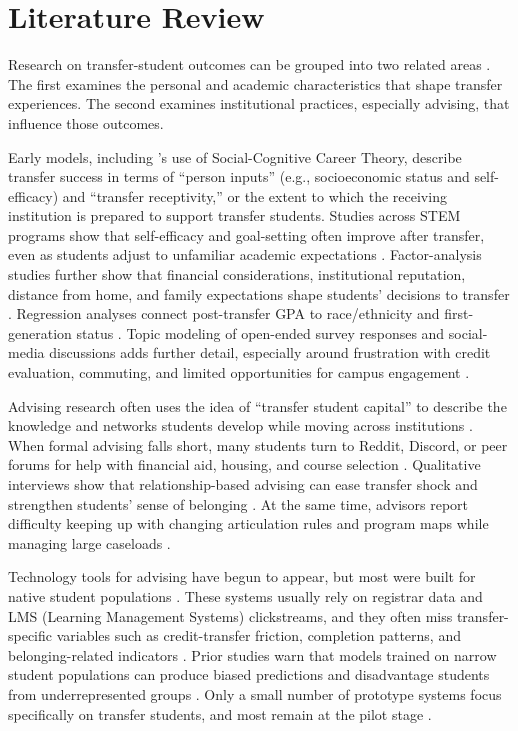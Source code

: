 \documentclass[letterpaper,11pt]{article}
\begin{document}
\section{Literature Review}\label{sec:literature}

Research on transfer-student outcomes can be grouped into two related areas \parencite{factoranalysis2023}. The first examines the personal and academic characteristics that shape transfer experiences. The second examines institutional practices, especially advising, that influence those outcomes.

Early models, including \textcite{computingtransfer2024}'s use of Social-Cognitive Career Theory, describe transfer success in terms of ``person inputs'' (e.g., socioeconomic status and self-efficacy) and ``transfer receptivity,'' or the extent to which the receiving institution is prepared to support transfer students. Studies across STEM programs show that self-efficacy and goal-setting often improve after transfer, even as students adjust to unfamiliar academic expectations \parencite{socialcognitive2022}. Factor-analysis studies further show that financial considerations, institutional reputation, distance from home, and family expectations shape students' decisions to transfer \parencite{factoranalysis2023}. Regression analyses connect post-transfer GPA to race/ethnicity and first-generation status \parencite{computingtransfer2024}. Topic modeling of open-ended survey responses and social-media discussions adds further detail, especially around frustration with credit evaluation, commuting, and limited opportunities for campus engagement \parencite{standfast2024reddit}.

Advising research often uses the idea of ``transfer student capital'' to describe the knowledge and networks students develop while moving across institutions \parencite{lukszo2020}. When formal advising falls short, many students turn to Reddit, Discord, or peer forums for help with financial aid, housing, and course selection \parencite{standfast2024reddit}. Qualitative interviews show that relationship-based advising can ease transfer shock and strengthen students' sense of belonging \parencite{thiry2023}. At the same time, advisors report difficulty keeping up with changing articulation rules and program maps while managing large caseloads \parencite{nguyen2024community,nguyen2025school}.

Technology tools for advising have begun to appear, but most were built for native student populations \parencite{nguyen2024community}. These systems usually rely on registrar data and LMS (Learning Management Systems) clickstreams, and they often miss transfer-specific variables such as credit-transfer friction, completion patterns, and belonging-related indicators \parencite{nguyen2024community,nguyen2025school}. Prior studies warn that models trained on narrow student populations can produce biased predictions and disadvantage students from underrepresented groups \parencite{socialcognitive2022,computingtransfer2024}. Only a small number of prototype systems focus specifically on transfer students, and most remain at the pilot stage \parencite{topicmodeling2024}.
\end{document}
